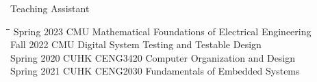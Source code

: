 
\begin{rSection}{Teaching Assistant}
\begin{tabbing}
    \hspace{1in}\= \hspace{1in}\= \kill
    Spring 2023 \> CMU  Mathematical Foundations of Electrical Engineering \\
   Fall 2022  \>  CMU  Digital System Testing and Testable Design \\
Spring 2020  \> CUHK  \>  CENG3420 Computer Organization and Design \\
Spring 2021  \> CUHK  \>  CENG2030  Fundamentals of Embedded Systems
\end{tabbing}
\end{rSection}

